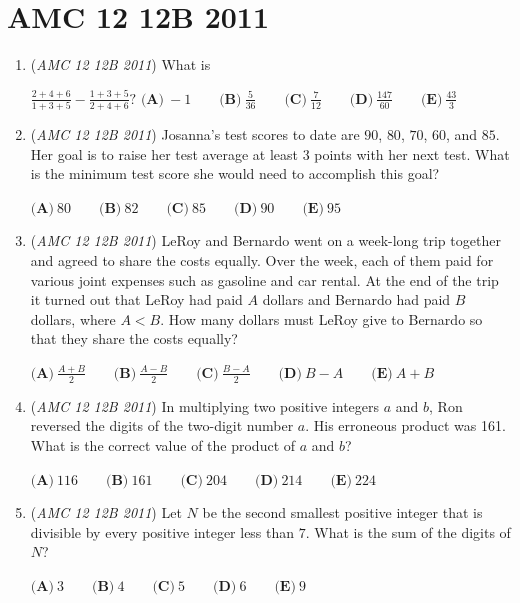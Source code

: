 \section{AMC 12 12B 2011}
        \begin{enumerate}
        	\item (\textit{AMC 12 12B 2011}) 
What is 

 $\frac{2+4+6}{1+3+5}-\frac{1+3+5}{2+4+6}?$
$\textbf{(A)}\ -1 \qquad \textbf{(B)}\ \frac{5}{36} \qquad \textbf{(C)}\ \frac{7}{12} \qquad \textbf{(D)}\ \frac{147}{60} \qquad \textbf{(E)}\ \frac{43}{3}$


	\item (\textit{AMC 12 12B 2011}) Josanna's test scores to date are $90$, $80$, $70$, $60$, and $85$.  Her goal is to raise her test average at least $3$ points with her next test.  What is the minimum test score she would need to accomplish this goal?


 $\textbf{(A)}\ 80 \qquad \textbf{(B)}\ 82 \qquad \textbf{(C)}\ 85 \qquad \textbf{(D)}\ 90 \qquad \textbf{(E)}\ 95$


	\item (\textit{AMC 12 12B 2011}) LeRoy and Bernardo went on a week-long trip together and agreed to share the costs equally.  Over the week, each of them paid for various joint expenses such as gasoline and car rental.  At the end of the trip it turned out that LeRoy had paid $A$ dollars and Bernardo had paid $B$ dollars, where $A<B$.  How many dollars must LeRoy give to Bernardo so that they share the costs equally?


 $\textbf{(A)}\ \frac{A+B}{2} \qquad \textbf{(B)}\ \frac{A-B}{2} \qquad \textbf{(C)}\ \frac{B-A}{2} \qquad \textbf{(D)}\ B-A \qquad \textbf{(E)}\ A+B$


	\item (\textit{AMC 12 12B 2011}) In multiplying two positive integers $a$ and $b$, Ron reversed the digits of the two-digit number $a$.  His erroneous product was 161.  What is the correct value of the product of $a$ and $b$?


 $\textbf{(A)}\ 116 \qquad \textbf{(B)}\ 161 \qquad \textbf{(C)}\ 204 \qquad \textbf{(D)}\ 214 \qquad \textbf{(E)}\ 224$


	\item (\textit{AMC 12 12B 2011}) Let $N$ be the second smallest positive integer that is divisible by every positive integer less than $7$.  What is the sum of the digits of $N$?


 $\textbf{(A)}\ 3 \qquad \textbf{(B)}\ 4 \qquad \textbf{(C)}\ 5 \qquad \textbf{(D)}\ 6 \qquad \textbf{(E)}\ 9$



\end{enumerate}

